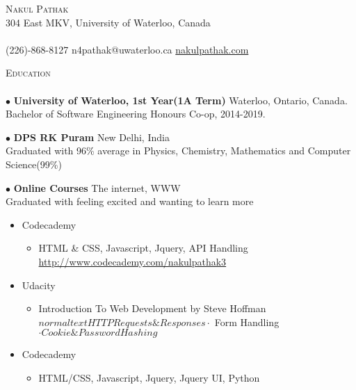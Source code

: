 \documentclass{article}
\newcommand{\lineunder}{\vspace*{-8pt} \\ \hspace*{-18pt} \hrulefill \\}
\newcommand{\header}[1]{{\hspace*{-15pt}\vspace*{6pt} \textsc{#1}} \vspace*{-6pt} \lineunder}
\newcommand{\contact}[3]{
\vspace*{-8pt}
\begin{center}
{\LARGE \scshape {#1}}\\
#2 \lineunder 
#3
\end{center}
\vspace*{-8pt}
}
\newcommand{\schoolwithcourses}[4]{
$\bullet$
 \textbf{#1}  #2\\ 
#3   \\
\vspace*{5pt}
}
\begin{document}
\small
\smallskip
\vspace*{-57pt}

\contact{Nakul Pathak}
{\normalsize 304 East MKV, University of Waterloo, Canada}
{\normalsize(226)-868-8127  \hfill n4pathak@uwaterloo.ca   \hfill \urlstyle{same}\url{nakulpathak.com}}
{
\vspace{10pt}
\header{Education}

\schoolwithcourses{University of Waterloo, 1st Year(1A Term)}{Waterloo, Ontario, Canada.}{Bachelor of Software Engineering Honours Co-op, 2014-2019. }
{}
\schoolwithcourses{DPS RK Puram}{New Delhi, India}{Graduated with 96\% average in Physics, Chemistry, Mathematics and Computer Science(99\%)}
{}
\schoolwithcourses{Online Courses}{The internet, WWW}{Graduated with feeling excited and wanting to learn more}{}
\vspace{-6pt}
\begin{itemize}
	\vspace{-4pt}
\item Codecademy
	\begin{itemize}
	\vspace{-5pt}
	\item HTML \& CSS, Javascript, Jquery, API Handling 
	\\ \url{http://www.codecademy.com/nakulpathak3}
	\end{itemize}
	\vspace{-4pt}
\item Udacity
	\begin{itemize}
	\vspace{-5pt}
	\item Introduction To Web Development by Steve Hoffman
	\\ \indent $normaltext{HTTP Requests \& Responses} \cdot $ Form Handling$ \cdot Cookie \& Password Hashing$
	
	\end{itemize}
	\vspace{-4pt}
\item Codecademy
	\begin{itemize}
	\vspace{-5pt}
	\item HTML/CSS, Javascript, Jquery, Jquery UI, Python
	\end{itemize}
\end{itemize}


}
\end{document}
